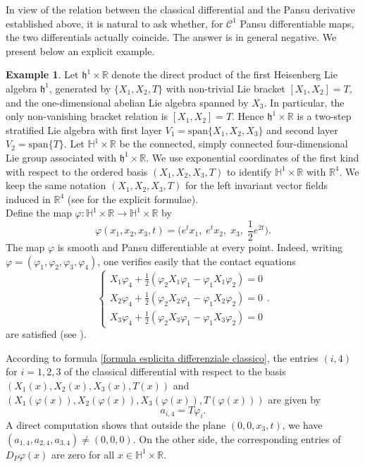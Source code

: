 \documentclass[dvipsnames]{amsart}
\theoremstyle{definition}
\newtheorem{example}[theorem]{Example}
\theoremstyle{definition}
\numberwithin{equation}{section}
\begin{document}
\medskip
In view of the relation between the classical differential and the Pansu derivative established above, it is natural to ask whether, for $\mathcal{C}^1$  Pansu differentiable maps, the two differentials actually coincide.
The answer is in general negative. We present below an explicit example.
\begin{example}\label{example comparison Pansu and classical differential}
    Let $\mathfrak{h}^1 \times \mathbb{R}$ denote the direct product of the first Heisenberg Lie algebra $\mathfrak{h}^1$, generated by $\{X_1,X_2,T\}$ with non-trivial Lie bracket $[X_1,X_2]=T$, and the one-dimensional abelian Lie algebra spanned by $X_3$. In particular, the only non-vanishing bracket relation is $[X_1,X_2]=T$. Hence $\mathfrak{h}^1 \times \mathbb{R}$ is a two-step stratified Lie algebra with first layer $V_1 = \mathrm{span}\{X_1,X_2,X_3\}$ and second layer $V_2 = \mathrm{span}\{T\}.$
    Let $\mathbb{H}^1 \times \mathbb{R}$ be the connected, simply connected four-dimensional Lie group associated with $\mathfrak{h}^1 \times \mathbb{R}$. We use exponential coordinates of the first kind with respect to the ordered basis $(X_1,X_2,X_3,T)$ to identify $\mathbb{H}^1 \times \mathbb{R}$ with $\mathbb{R}^4$. We keep the same notation $(X_1,X_2,X_3,T)$ for the left invariant vector fields induced in $\mathbb{R}^4$ (see \cite{LeDonneTripaldi2021} for the explicit formulae).\\
    Define the map $\varphi : \mathbb{H}^1 \times \mathbb{R} \to \mathbb{H}^1 \times \mathbb{R}$ by
\begin{equation*}
\varphi(x_1,x_2,x_3,t)
=
\Big(e^{t}x_1,\; e^{t}x_2,\; x_3,\; \frac{1}{2} e^{2t}\Big).
\end{equation*}
The map $\varphi$ is smooth and Pansu differentiable at every point. Indeed, writing $\varphi=(\varphi_1,\varphi_2,\varphi_3,\varphi_4)$, one verifies easily that the contact equations
   \begin{equation*}
\begin{cases}
    X_1\varphi_4 + \frac{1}{2}(\varphi_2 X_1\varphi_1 - \varphi_1 X_1\varphi_2) = 0 \\
    X_2\varphi_4 + \frac{1}{2}(\varphi_2 X_2\varphi_1 - \varphi_1 X_2\varphi_2) = 0\\
    X_3\varphi_4 + \frac{1}{2}(\varphi_2 X_3\varphi_1 - \varphi_1 X_3\varphi_2) = 0
\end{cases}.
\end{equation*}
are satisfied (see \cite[Theorem 1.1]{Magnani_2013}).

According to formula \eqref{formula esplicita differenziale classico}, the entries $(i,4)$ for $i=1,2,3$ of the classical differential with respect to the basis $(X_1(x), X_2(x), X_3(x), T(x))$ and $(X_1(\varphi(x)), X_2(\varphi(x)), X_3(\varphi(x)), T(\varphi(x)))$ are given by
\begin{equation*}
    a_{i,4} = T\varphi_i.
\end{equation*}
A direct computation shows that outside the plane $(0,0,x_3,t)$, we have $(a_{1,4},a_{2,4},a_{3,4}) \not= (0,0,0)$. On the other side, the corresponding entries of $D_P\varphi(x)$ are zero for all $x \in \mathbb{H}^1 \times \mathbb{R}$.
\end{example}
\end{document}

